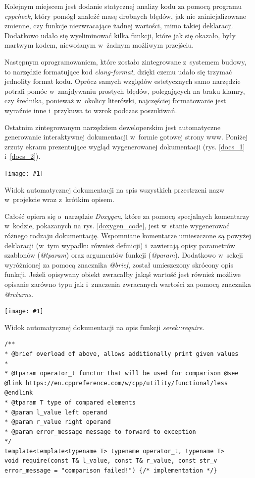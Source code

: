 \documentclass[12pt]{article}
\newcommand{\n}{\newline}
\newcommand{\putss}[3]{
\begin{captioned}[H]
	\centering
	\texttt{[image: \#1]}
	\caption{#2}
	\label{#3}
	\medskip
\end{captioned}
}
\newcommand{\nonpl}[1]{{\it #1}}
\newcommand{\code}[1]{{\it #1}}
\begin{document}
{{{				Kolejnym miejscem jest dodanie statycznej analizy kodu za pomocą programu \nonpl{cppcheck}\cite{cppcheck_repo}, który pomógł znaleźć masę drobnych błędów,
				jak nie zainicjalizowane zmienne, czy funkcje niezwracające żadnej wartości, mimo takiej deklaracji. Dodatkowo udało się wyeliminować kilka funkcji,
				które jak się okazało, były martwym kodem, niewołanym w~żadnym możliwym przejściu.\n

				Następnym oprogramowaniem, które zostało zintegrowane z~systemem budowy, to narzędzie formatujące kod \nonpl{clang-format}\cite{clangformat_docs}, dzięki czemu
				udało się trzymać jednolity format kodu. Oprócz samych względów estetycznych samo narzędzie potrafi pomóc w~znajdywaniu prostych błędów, polegających
				na braku klamry, czy średnika, ponieważ w~okolicy literówki, najczęściej formatowanie jest wyraźnie inne i~przykuwa to wzrok podczas poszukiwań.\n

				Ostatnim zintegrowanym narzędziem deweloperskim jest automatyczne generowanie interaktywnej dokumentacji w~formie gotowej strony www. Poniżej zrzuty
				ekranu prezentujące wygląd wygenerowanej dokumentacji (rys. \ref{docs_1} i~\ref{docs_2}).\n

				\putss{./img/documentation_part_1.png}{Widok automatycznej dokumentacji na spis wszystkich przestrzeni nazw w~projekcie wraz z~krótkim opisem.}{docs_1}

				Całość opiera się o~narzędzie \nonpl{Doxygen}\cite{doxygen_docs}, które za pomocą specjalnych komentarzy w~kodzie, pokazanych na rys. \ref{doxygen_code},
				jest w~stanie wygenerować różnego rodzaju dokumentację. Wspomniane komentarze umieszczone są powyżej deklaracji (w~tym wypadku również definicji) i~zawierają
				opisy parametrów szablonów (\code{@tparam}) oraz argumentów funkcji (\code{@param}). Dodatkowo w~sekcji wyróżnionej za pomocą znacznika \code{@brief}, został
				umieszczony skrócony opis funkcji. Jeżeli opisywany obiekt zwracałby jakąś wartość jest również możliwe opisanie zarówno typu jak i~znaczenia zwracanych wartości
				za pomocą znacznika \code{@returns}.\n

				\putss{./img/documentation_part_2.png}{Widok automatycznej dokumentacji na opis funkcji \code{serek::require}.}{docs_2}

				\begin{captioned}[H]
					\begin{lstlisting}[frame=single]
/**
* @brief overload of above, allows additionally print given values
*
* @tparam operator_t functor that will be used for comparison @see @link https://en.cppreference.com/w/cpp/utility/functional/less @endlink
* @tparam T type of compared elements
* @param l_value left operand
* @param r_value right operand
* @param error_message message to forward to exception
*/
template<template<typename T> typename operator_t, typename T>
void require(const T& l_value, const T& r_value, const str_v error_message = "comparison failed!") {/* implementation */}


\end{lstlisting}
\end{captioned}}}}
\end{document}
